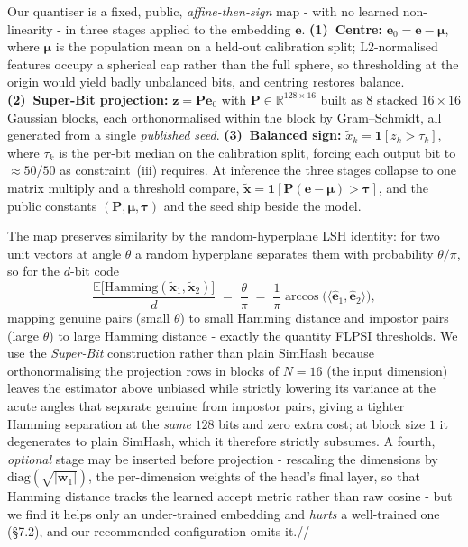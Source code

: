 \documentclass[11pt,a4paper]{article}
\begin{document}
Our quantiser is a fixed, public, \emph{affine-then-sign} map - with no learned
non-linearity - in three stages applied to the embedding $\mathbf{e}$.
\textbf{(1)~Centre:} $\mathbf{e}_0=\mathbf{e}-\boldsymbol{\mu}$, where
$\boldsymbol{\mu}$ is the population mean on a held-out calibration split;
L2-normalised features occupy a spherical cap rather than the full sphere, so
thresholding at the origin would yield badly unbalanced bits, and centring restores
balance. \textbf{(2)~Super-Bit projection:} $\mathbf{z}=\mathbf{P}\mathbf{e}_0$ with
$\mathbf{P}\in\mathbb{R}^{128\times16}$ built as $8$ stacked $16\times16$ Gaussian
blocks, each orthonormalised within the block by Gram--Schmidt, all generated from a
single \emph{published seed}. \textbf{(3)~Balanced sign:}
$\tilde{x}_k=\mathbf{1}[z_k>\tau_k]$, where $\tau_k$ is the per-bit median on the
calibration split, forcing each output bit to $\approx 50/50$ as constraint~(iii)
requires. At inference the three stages collapse to one matrix multiply and a
threshold compare,
$\tilde{\mathbf{x}}=\mathbf{1}[\mathbf{P}(\mathbf{e}-\boldsymbol{\mu})>\boldsymbol{\tau}]$,
and the public constants $(\mathbf{P},\boldsymbol{\mu},\boldsymbol{\tau})$ and the seed
ship beside the model.

The map preserves similarity by the random-hyperplane LSH identity: for two unit
vectors at angle $\theta$ a random hyperplane separates them with probability
$\theta/\pi$, so for the $d$-bit code
\[
  \frac{\mathbb{E}\big[\mathrm{Hamming}(\tilde{\mathbf{x}}_1,\tilde{\mathbf{x}}_2)\big]}{d}
  \;=\; \frac{\theta}{\pi}
  \;=\; \frac{1}{\pi}\arccos\!\big(\langle\hat{\mathbf{e}}_1,\hat{\mathbf{e}}_2\rangle\big),
\]
mapping genuine pairs (small $\theta$) to small Hamming distance and impostor pairs
(large $\theta$) to large Hamming distance - exactly the quantity FLPSI thresholds.
We use the \emph{Super-Bit} construction rather than plain SimHash because
orthonormalising the projection rows in blocks of $N=16$ (the input dimension) leaves
the estimator above unbiased while strictly lowering its variance at the acute angles
that separate genuine from impostor pairs, giving a tighter Hamming separation at the
\emph{same} $128$ bits and zero extra cost; at block size $1$ it degenerates to plain
SimHash, which it therefore strictly subsumes. A fourth, \emph{optional} stage may be
inserted before projection - rescaling the dimensions by
$\mathrm{diag}(\sqrt{|\mathbf{w}_1|})$, the per-dimension weights of the head's final
layer, so that Hamming distance tracks the learned accept metric rather than raw
cosine - but we find it helps only an under-trained embedding and \emph{hurts} a
well-trained one (\S7.2), and our recommended configuration omits it.//
\end{document}

